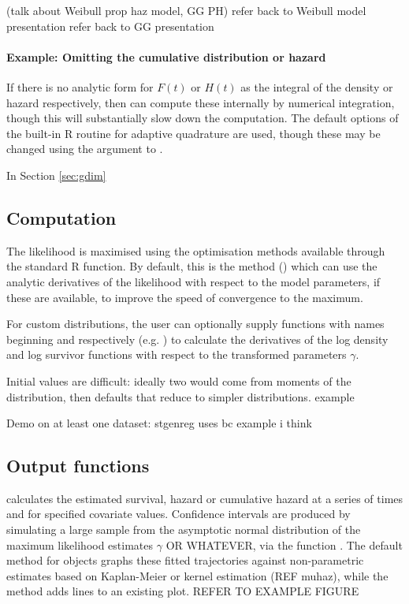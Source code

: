 \documentclass[nojss,nofooter]{jss}
\begin{document}
(talk about Weibull prop haz model, GG PH)
refer back to Weibull model presentation
refer back to GG presentation 

\paragraph{Example: Omitting the cumulative distribution or hazard}

If there is no analytic form for $F(t)$ or $H(t)$ as the integral of
the density or hazard respectively, then  can compute
these internally by numerical integration, though this will
substantially slow down the computation.  The default options of the
built-in R routine  for adaptive quadrature are used,
though these may be changed using the  argument to
.


In Section \ref{sec:gdim} 


\subsection{Computation}

The likelihood is maximised using the optimisation methods available
through the standard R  function.  By default, this is the
 method (\citep{nash}) which can use the analytic
derivatives of the likelihood with respect to the model parameters, if
these are available, to improve the speed of convergence to the
maximum.

For custom distributions, the user can optionally supply functions
with names beginning  and  respectively
(e.g. ) to calculate the derivatives of
the log density and log survivor functions with respect to the
transformed parameters $\gamma$.

Initial values are difficult: ideally two would come from moments of
the distribution, then defaults that reduce to simpler distributions.
example

Demo on at least one dataset: stgenreg uses bc example i think




\subsection{Output functions}

 calculates the estimated survival, hazard
or cumulative hazard at a series of times and for specified covariate
values. Confidence intervals are produced by simulating a large sample
from the asymptotic normal distribution of the maximum likelihood
estimates $\gamma$ OR WHATEVER, via the function
.  The default  method for
 objects graphs these fitted trajectories against
non-parametric estimates based on Kaplan-Meier or kernel estimation
(REF muhaz), while the  method adds lines to an existing
plot.  REFER TO EXAMPLE FIGURE
\end{document}
